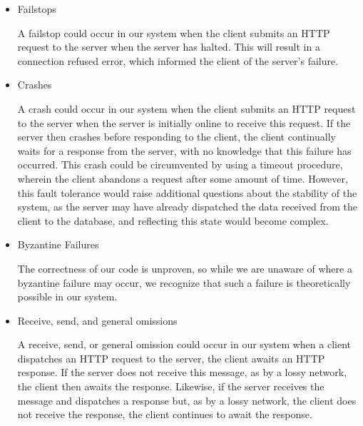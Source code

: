 \documentclass[11pt]{article} %
\begin{document}
\begin{itemize} 
\item Failstops


A failstop could occur in our system when the client submits an HTTP request to the server when the server has halted. This will result in a connection refused error, which informed the client of the server's failure. 

\item Crashes

A crash could occur in our system when the client submits an HTTP request to the server when the server is initially online to receive this request. If the server then crashes before responding to the client, the client continually waits for a response from the server, with no knowledge that this failure has occurred. This crash could be circumvented by using a timeout procedure, wherein the client abandons a request after some amount of time. However, this fault tolerance would raise additional questions about the stability of the system, as the server may have already dispatched the data received from the client to the database, and reflecting this state would become complex. 

\item Byzantine Failures 

The correctness of our code is unproven, so while we are unaware of where a byzantine failure may occur, we recognize that such a failure is theoretically possible in our system. 

\item Receive, send, and general omissions


A receive, send, or general omission could occur in our system when a client dispatches an HTTP request to the server, the client awaits an HTTP response. If the server does not receive this message, as by a lossy network, the client then awaits the response. Likewise, if the server receives the message and dispatches a response but, as by a lossy network, the client does not receive the response, the client continues to await the response. 

\end{itemize} 
\end{document}
